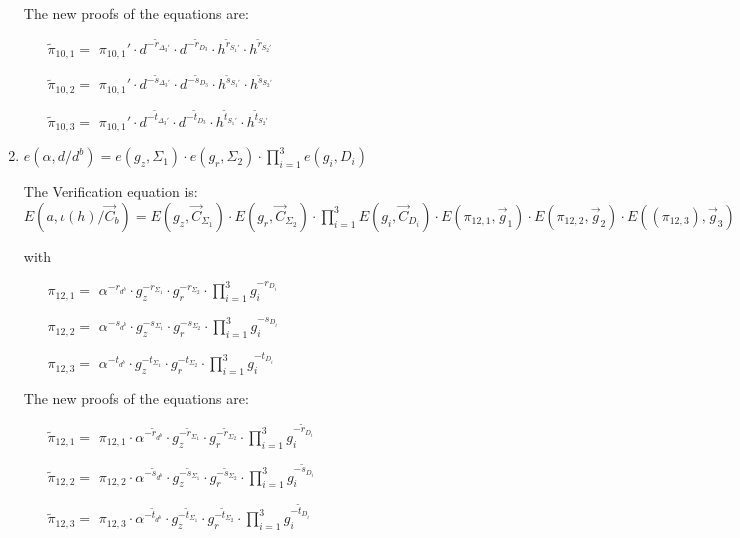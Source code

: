 \begin{description}
\begin{enumerate}
    The new proofs of the equations are:

    \begin{itemize}
    \item[$\tilde{\pi}_{10,1} = $] $\pi_{10,1}' \cdot d^{-\tilde{r}_{\Delta_3'}} \cdot d^{-\tilde{r}_{D_3}} \cdot h^{\tilde{r}_{S_1'}} \cdot h^{\tilde{r}_{S_2'}}$
    \item[$\tilde{\pi}_{10,2} = $] $\pi_{10,1}' \cdot d^{-\tilde{s}_{\Delta_3'}} \cdot d^{-\tilde{s}_{D_3}} \cdot h^{\tilde{s}_{S_1'}} \cdot h^{\tilde{s}_{S_2'}}$
    \item[$\tilde{\pi}_{10,3} = $] $\pi_{10,1}' \cdot d^{-\tilde{t}_{\Delta_3'}} \cdot d^{-\tilde{t}_{D_3}} \cdot h^{\tilde{t}_{S_1'}} \cdot h^{\tilde{t}_{S_2'}}$
    \end{itemize}
    
    
  \item $e(\alpha, d/\boxed{d^b}) = e(g_z, \boxed{\Sigma_1}) \cdot e(g_r, \boxed{\Sigma_2}) \cdot \prod_{i=1}^3 e(g_i, \boxed{D_i})$

    The Verification equation is: $E(a, \iota(h)/\vec{C}_{b}) = E(g_z, \vec{C}_{\Sigma_1}) \cdot E(g_r, \vec{C}_{\Sigma_2}) \cdot \prod_{i=1}^3 E(g_i, \vec{C}_{D_i}) \cdot E(\pi_{12,1}, \vec{g}_1)\cdot E(\pi_{12,2}, \vec{g}_2)\cdot E((\pi_{12,3}), \vec{g}_3)$

    with
    \begin{itemize}
    \item[$\pi_{12,1} = $] $\alpha^{-r_{d^b}} \cdot g_z^{-r_{\Sigma_1}} \cdot g_r^{-r_{\Sigma_2}} \cdot \prod_{i=1}^3 g_i^{-r_{D_i}}$
    \item[$\pi_{12,2} = $] $\alpha^{-s_{d^b}} \cdot g_z^{-s_{\Sigma_1}} \cdot g_r^{-s_{\Sigma_2}} \cdot \prod_{i=1}^3 g_i^{-s_{D_i}}$
    \item[$\pi_{12,3} = $] $\alpha^{-t_{d^b}} \cdot g_z^{-t_{\Sigma_1}} \cdot g_r^{-t_{\Sigma_2}} \cdot \prod_{i=1}^3 g_i^{-t_{D_i}}$
    \end{itemize}

    The new proofs of the equations are:
    \begin{itemize}
    \item[$\tilde{\pi}_{12,1} = $] $\pi_{12,1} \cdot \alpha^{-\tilde{r}_{d^b}} \cdot g_z^{-\tilde{r}_{\Sigma_1}} \cdot g_r^{-\tilde{r}_{\Sigma_2}} \cdot \prod_{i=1}^3 g_i^{-\tilde{r}_{D_i}}$
    \item[$\tilde{\pi}_{12,2} = $] $\pi_{12,2} \cdot \alpha^{-\tilde{s}_{d^b}} \cdot g_z^{-\tilde{s}_{\Sigma_1}} \cdot g_r^{-\tilde{s}_{\Sigma_2}} \cdot \prod_{i=1}^3 g_i^{-\tilde{s}_{D_i}}$
    \item[$\tilde{\pi}_{12,3} = $] $\pi_{12,3} \cdot \alpha^{-\tilde{t}_{d^b}} \cdot g_z^{-\tilde{t}_{\Sigma_1}} \cdot g_r^{-\tilde{t}_{\Sigma_2}} \cdot \prod_{i=1}^3 g_i^{-\tilde{t}_{D_i}}$
    \end{itemize}


\end{enumerate}
\end{description}
